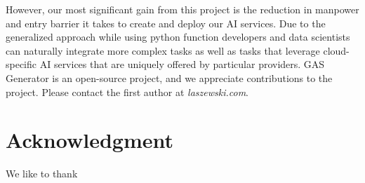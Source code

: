 However, our most significant gain from this project is the reduction in manpower and entry barrier it takes to create and deploy our AI services. Due to the generalized approach while using python function developers and data scientists can naturally integrate more complex tasks as well as tasks that leverage cloud-specific AI services that are uniquely offered by particular providers. GAS Generator is an open-source project, and we appreciate contributions to the project. Please contact the first author at  \textit{laszewski\@gmail.com}.


\section*{Acknowledgment}

We like to thank



